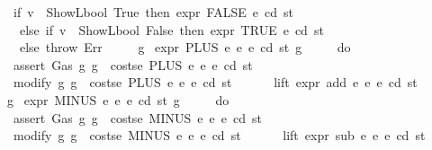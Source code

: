\begin{isabellebody}
\ \ \ \ \ \ {\isacharparenleft}{\kern0pt}if\ v\ {\isacharequal}{\kern0pt}\ ShowL\isactrlsub b\isactrlsub o\isactrlsub o\isactrlsub l\ True\ then\ expr\ FALSE\ e\ cd\ st\isanewline
\ \ \ \ \ \ \ else\ if\ v\ {\isacharequal}{\kern0pt}\ ShowL\isactrlsub b\isactrlsub o\isactrlsub o\isactrlsub l\ False\ then\ expr\ TRUE\ e\ cd\ st\isanewline
\ \ \ \ \ \ \ else\ throw\ Err{\isacharparenright}{\kern0pt}\isanewline
\ \ \ \ {\isacharbraceright}{\kern0pt}{\isacharparenright}{\kern0pt}\ g{\isachardoublequoteclose}\isanewline
{\isacharbar}{\kern0pt}\ {\isachardoublequoteopen}expr\ {\isacharparenleft}{\kern0pt}PLUS\ e{}\ e{}{\isacharparenright}{\kern0pt}\ e\ cd\ st\ g\ {\isacharequal}{\kern0pt}\isanewline
\ \ \ \ {\isacharparenleft}{\kern0pt}do\ {\isacharbraceleft}{\kern0pt}\isanewline
\ \ \ \ \ \ assert\ Gas\ {\isacharparenleft}{\kern0pt}{\isasymlambda}g{\isachardot}{\kern0pt}\ g\ {\isachargreater}{\kern0pt}\ costs\isactrlsub e\ {\isacharparenleft}{\kern0pt}PLUS\ e{}\ e{}{\isacharparenright}{\kern0pt}\ e\ cd\ st{\isacharparenright}{\kern0pt}{\isacharsemicolon}{\kern0pt}\isanewline
\ \ \ \ \ \ modify\ {\isacharparenleft}{\kern0pt}{\isasymlambda}g{\isachardot}{\kern0pt}\ g\ {\isacharminus}{\kern0pt}\ costs\isactrlsub e\ {\isacharparenleft}{\kern0pt}PLUS\ e{}\ e{}{\isacharparenright}{\kern0pt}\ e\ cd\ st{\isacharparenright}{\kern0pt}{\isacharsemicolon}{\kern0pt}\isanewline
\ \ \ \ \ \ lift\ expr\ add\ e{}\ e{}\ e\ cd\ st\isanewline
\ \ \ \ {\isacharbraceright}{\kern0pt}{\isacharparenright}{\kern0pt}\ g{\isachardoublequoteclose}\isanewline
{\isacharbar}{\kern0pt}\ {\isachardoublequoteopen}expr\ {\isacharparenleft}{\kern0pt}MINUS\ e{}\ e{}{\isacharparenright}{\kern0pt}\ e\ cd\ st\ g\ {\isacharequal}{\kern0pt}\isanewline
\ \ \ \ {\isacharparenleft}{\kern0pt}do\ {\isacharbraceleft}{\kern0pt}\isanewline
\ \ \ \ \ \ assert\ Gas\ {\isacharparenleft}{\kern0pt}{\isasymlambda}g{\isachardot}{\kern0pt}\ g\ {\isachargreater}{\kern0pt}\ costs\isactrlsub e\ {\isacharparenleft}{\kern0pt}MINUS\ e{}\ e{}{\isacharparenright}{\kern0pt}\ e\ cd\ st{\isacharparenright}{\kern0pt}{\isacharsemicolon}{\kern0pt}\isanewline
\ \ \ \ \ \ modify\ {\isacharparenleft}{\kern0pt}{\isasymlambda}g{\isachardot}{\kern0pt}\ g\ {\isacharminus}{\kern0pt}\ costs\isactrlsub e\ {\isacharparenleft}{\kern0pt}MINUS\ e{}\ e{}{\isacharparenright}{\kern0pt}\ e\ cd\ st{\isacharparenright}{\kern0pt}{\isacharsemicolon}{\kern0pt}\isanewline
\ \ \ \ \ \ lift\ expr\ sub\ e{}\ e{}\ e\ cd\ st\isanewline

\end{isabellebody}
